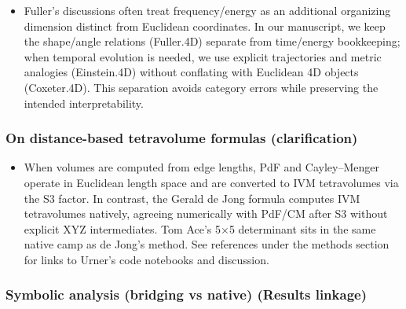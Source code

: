 \documentclass[
  10pt,
]{article}
\providecommand{\tightlist}{%
  \setlength{\itemsep}{0pt}\setlength{\parskip}{0pt}}
\begin{document}
\begin{itemize}
\tightlist
\item
  Fuller's discussions often treat frequency/energy as an additional
  organizing dimension distinct from Euclidean coordinates. In our
  manuscript, we keep the shape/angle relations (Fuller.4D) separate
  from time/energy bookkeeping; when temporal evolution is needed, we
  use explicit trajectories and metric analogies (Einstein.4D) without
  conflating with Euclidean 4D objects (Coxeter.4D). This separation
  avoids category errors while preserving the intended interpretability.
\end{itemize}

\hypertarget{on-distance-based-tetravolume-formulas-clarification}{%
\subsubsection{On distance-based tetravolume formulas
(clarification)}\label{on-distance-based-tetravolume-formulas-clarification}}

\begin{itemize}
\tightlist
\item
  When volumes are computed from edge lengths, PdF and Cayley--Menger
  operate in Euclidean length space and are converted to IVM
  tetravolumes via the S3 factor. In contrast, the Gerald de Jong
  formula computes IVM tetravolumes natively, agreeing numerically with
  PdF/CM after S3 without explicit XYZ intermediates. Tom Ace's 5×5
  determinant sits in the same native camp as de Jong's method. See
  references under the methods section for links to Urner's code
  notebooks and discussion.
\end{itemize}

\hypertarget{symbolic-analysis-bridging-vs-native-results-linkage}{%
\subsubsection{Symbolic analysis (bridging vs native) (Results
linkage)}\label{symbolic-analysis-bridging-vs-native-results-linkage}}
\end{document}

